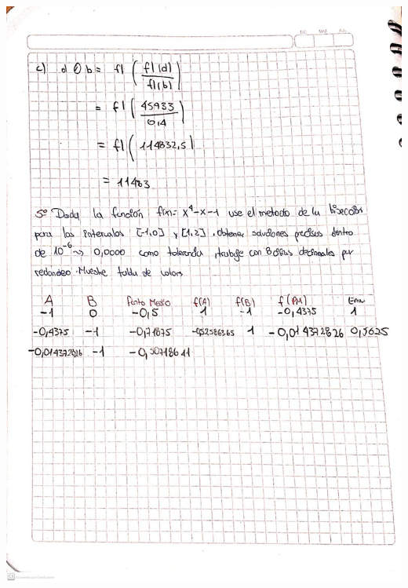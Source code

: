 \documentclass[12pt]{article}
\begin{document}
\begin{itemize}
\begin{minipage}{0.95\textwidth}
    \raggedleft
    \includegraphics[width=1.15\textwidth]{inFiles/Figures/ejer5.jpeg}
\end{minipage}
\vspace{3.5cm}


\end{itemize}
\end{document}
